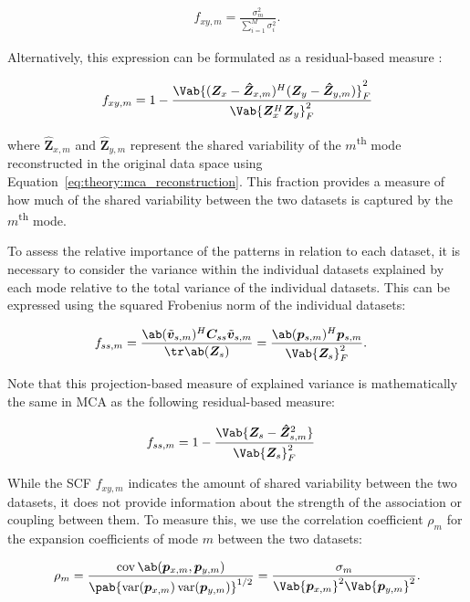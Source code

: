 \begin{align}\label{eq:theory:mca_scf_singular_values}
    f_{xy, m} = \frac{\sigma_m^2}{\sum_{i=1}^{M} \sigma_i^2}.
\end{align}

Alternatively, this expression can be formulated as a residual-based measure \cite{swenson_continuum_2015}:

\begin{align}\label{eq:theory:mca_scf_residual}
    f_{xy, m} = 1 - \frac{\Vab{(\bm{Z}_{x} - \bm{\hat{Z}}_{x,m})^H (\bm{Z}_{y} - \bm{\hat{Z}}_{y,m})}_F^2}{\Vab{\bm{Z}_{x}^H\bm{Z}_{y}}_F^2}
\end{align}

where $\bm{\hat{Z}}_{x,m}$ and $\bm{\hat{Z}}_{y,m}$ represent the shared variability of the $m$\textsuperscript{th} mode reconstructed in the original data space using Equation~\eqref{eq:theory:mca_reconstruction}. This fraction provides a measure of how much of the shared variability between the two datasets is captured by the $m$\textsuperscript{th} mode. 

To assess the relative importance of the patterns in relation to each dataset, it is necessary to consider the variance within the individual datasets explained by each mode relative to the total variance of the individual datasets. This can be expressed using the squared Frobenius norm of the individual datasets:

\begin{align}
    f_{ss, m} &= \frac{\ab(\bmn{v}_{s,m})^H\bm{C}_{ss}\bmn{v}_{s,m}}{\tr \ab( \bm{Z}_s )} = \frac{\ab(\bm{p}_{s,m})^H\bm{p}_{s,m}}{\Vab{\bm{Z}_s}_F^2}.
\end{align}

Note that this projection-based measure of explained variance is mathematically the same in MCA as the following residual-based measure:

\begin{align}\label{eq:theory:mca_explained_variance}
    f_{ss, m} &= 1 - \frac{\Vab{\bm{Z}_s - \bm{\hat{Z}}_{s,m}^2}}{\Vab{\bm{Z}_s}_F^2}
\end{align}

While the SCF $f_{xy, m}$ indicates the amount of shared variability between the two datasets, it does not provide information about the strength of the association or coupling between them. To measure this, we use the correlation coefficient $\rho_m$ for the expansion coefficients of mode $m$ between the two datasets:

\begin{align}
    \rho_m = \frac{\cov \ab(\bm{p}_{x,m}, \bm{p}_{y,m}) }{\pab{\var(\bm{p}_{x,m}) \var(\bm{p}_{y,m})}^{1/2}} =  \frac{\sigma_m}{\Vab{\bm{p}_{x,m}}^2 \Vab{\bm{p}_{y,m}}^2}.
\end{align}

